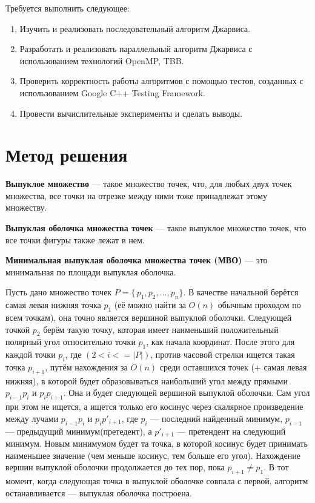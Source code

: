 \documentclass{report}
\begin{document}
\par Требуется выполнить следующее:

\begin{enumerate}
\item Изучить и реализовать последовательный алгоритм Джарвиса.
\item Разработать и реализовать параллельный алгоритм Джарвиса с использованием технологий OpenMP, TBB.
\item Проверить корректность работы алгоритмов с помощью тестов, созданных с использованием Google C++ Testing Framework.
\item Провести вычислительные эксперименты и сделать выводы.
\end{enumerate}
\newpage

\section*{Метод решения}
\textbf{Выпуклое множество} — такое множество точек, что, для любых двух точек множества, все точки на отрезке между ними тоже принадлежат этому множеству.

\par \textbf{Выпуклая оболочка множества точек} — такое выпуклое множество точек, что все точки фигуры также лежат в нем.

\par \textbf{Минимальная выпуклая оболочка множества точек (МВО)} — это минимальная по площади выпуклая оболочка.

Пусть дано множество точек $P=\{\,p_1, p_2, ..., p_n\}$. В качестве начальной берётся самая левая нижняя точка $p_1$ (её можно найти за $O(n)$ обычным проходом по всем точкам), она точно является вершиной выпуклой оболочки. Следующей точкой  $p_2$ берём такую точку, которая имеет наименьший положительный полярный угол относительно точки $p_1$, как начала координат. После этого для каждой точки $p_i$, где $(2<i<=|P|)$, против часовой стрелки ищется такая точка $p_{i+1}$, путём нахождения за $O(n)$ среди оставшихся точек (+ самая левая нижняя), в которой будет образовываться наибольший угол между прямыми $p_{i-1} p_i$ и $p_{i}p_{i+1}$. Она и будет следующей вершиной выпуклой оболочки. Сам угол при этом не ищется, а ищется только его косинус через скалярное произведение между лучами  $p_{i-1}p_{i}$ и $p_{i}p'_{i+1}$, где  $p_{i}$ — последний найденный минимум,  $p_{i-1}$ — предыдущий минимум(претедент), а $p'_{i+1}$ — претендент на следующий минимум. Новым минимумом будет та точка, в которой косинус будет принимать наименьшее значение (чем меньше косинус, тем больше его угол). Нахождение вершин выпуклой оболочки продолжается до тех пор, пока $p_{i+1}\neq p_{1}$. В тот момент, когда следующая точка в выпуклой оболочке совпала с первой, алгоритм останавливается — выпуклая оболочка построена.
\end{document}
